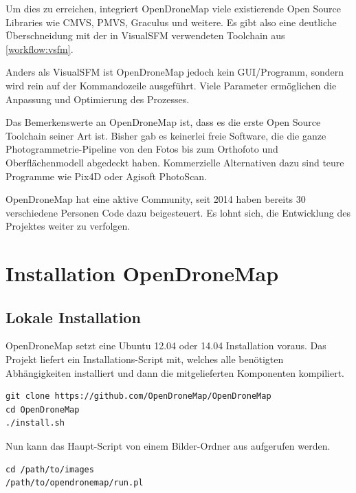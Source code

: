 Um dies zu erreichen, integriert OpenDroneMap viele existierende Open Source
Libraries wie CMVS, PMVS, Graculus und weitere. Es gibt also eine deutliche
Überschneidung mit der in VisualSFM verwendeten Toolchain aus
\autoref{workflow:vsfm}.

Anders als VisualSFM ist OpenDroneMap jedoch kein GUI\-/Programm, sondern wird
rein auf der Kommandozeile ausgeführt. Viele Parameter ermöglichen die Anpassung
und Optimierung des Prozesses.

Das Bemerkenswerte an OpenDroneMap ist, dass es die erste Open Source Toolchain
seiner Art ist. Bisher gab es keinerlei freie Software, die die ganze
Photogrammetrie-Pipeline von den Fotos bis zum Orthofoto und Oberflächenmodell
abgedeckt haben. Kommerzielle Alternativen dazu sind teure Programme wie Pix4D
oder Agisoft PhotoScan.

OpenDroneMap hat eine aktive Community, seit 2014 haben bereits 30 verschiedene
Personen Code dazu beigesteuert. Es lohnt sich, die Entwicklung des Projektes
weiter zu verfolgen.


\section{Installation OpenDroneMap}

\subsection{Lokale Installation}

OpenDroneMap setzt eine Ubuntu 12.04 oder 14.04 Installation voraus. Das
Projekt liefert ein Installations-Script mit, welches alle benötigten
Abhängigkeiten installiert und dann die mitgelieferten Komponenten kompiliert.

\vspace{0.5\baselineskip}
\begin{verbatim} 
git clone https://github.com/OpenDroneMap/OpenDroneMap
cd OpenDroneMap
./install.sh
\end{verbatim}

\noindent Nun kann das Haupt-Script von einem Bilder-Ordner aus aufgerufen werden.

\vspace{0.5\baselineskip}
\begin{verbatim} 
cd /path/to/images
/path/to/opendronemap/run.pl
\end{verbatim}

